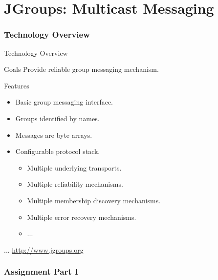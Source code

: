 \part{JGroups: Multicast Messaging}


\section{Technology Overview}




\begin{frame}{Technology Overview}
    \begin{block}{Goals}
        Provide reliable group messaging mechanism.
    \end{block}

    \bigskip

    \begin{block}{Features}
        \begin{itemize}
            \item Basic group messaging interface.
            \item Groups identified by names.
            \item Messages are byte arrays.
            \item Configurable protocol stack.
            \begin{itemize}
                \item Multiple underlying transports.
                \item Multiple reliability mechanisms.
                \item Multiple membership discovery mechanisms.
                \item Multiple error recovery mechanisms.
                \item ...
            \end{itemize}
        \end{itemize}
    \end{block}

    \bigskip

    \hfill ... \url{http://www.jgroups.org}
\end{frame}


\section{Assignment Part I}



